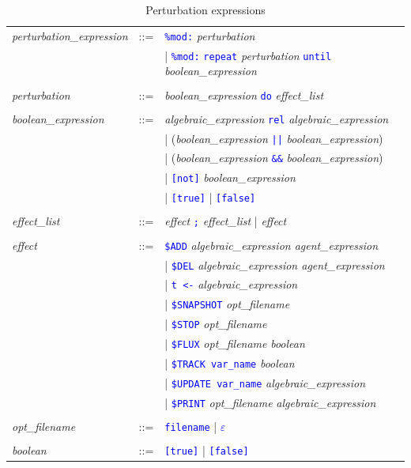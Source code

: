 \documentclass[11pt]{book}
\def\tcb#1{\textcolor{blue}{\ttt{#1}}}
\def\ttt#1{\texttt{#1}}
\def\var#1{\textquotesingle #1\textquotesingle}
\begin{document}
\begin{table}[htbp]
  \centering
  \caption{Perturbation expressions}
  \begin{tabular}{@{} lcl @{}}
  	\textit{perturbation\_expression} &::=& \tcb{\ttt{\%mod:}} \textit{perturbation} \\
	&& | \tcb{\ttt{\%mod:}} \tcb{\ttt{repeat}} \textit{perturbation} \tcb{\ttt{until}} \textit{boolean\_expression} \\\\ 
    
    \textit{perturbation} &::=& \textit{boolean\_expression} \tcb{\ttt{do}} \textit{effect\_list} \\\\
    \textit{boolean\_expression} &::=& \textit{algebraic\_expression}\index{boolean expression} \tcb{rel} \textit{algebraic\_expression} \\
    && | (\textit{boolean\_expression} \tcb{||} \textit{boolean\_expression}) \\
    && | (\textit{boolean\_expression} \tcb{\&\&} \textit{boolean\_expression}) \\
    && | \tcb{[not]} \textit{boolean\_expression} \\
    && | \tcb{[true]} | \tcb{[false]} \\\\
    \textit{effect\_list} &::=& \textit{effect} \tcb{\ttt {;}} \textit{effect\_list} | \textit{effect} \\\\
\textit{effect} &::=& \tcb{\$ADD} \textit{algebraic\_expression agent\_expression} \\
    && | \tcb{\$DEL} \textit{algebraic\_expression agent\_expression} \\
    && | \tcb{t <-} \textit{algebraic\_expression} \\
    && | \tcb{\$SNAPSHOT} \textit{opt\_filename}\\ 
    && | \tcb{\$STOP} \textit{opt\_filename}\\
	&& | \tcb{\$FLUX} \textit{opt\_filename} \textit{boolean} \\
    && | \tcb{\$TRACK \var{var\_name}} \textit{boolean} \\
    && | \tcb{\$UPDATE \var{var\_name}} \textit{algebraic\_expression} \\
    && | \tcb{\$PRINT} \textit{opt\_filename} \textit{algebraic\_expression} \\\\
    \textit{opt\_filename} &::=& \tcb{\var{\var{filename}}} | \tcb{$\varepsilon$} \\\\
	\textit{boolean} &::=& \tcb{[true]} | \tcb{[false]}
  \end{tabular}
  \label{tab:pert}
\end{table}
\end{document}
